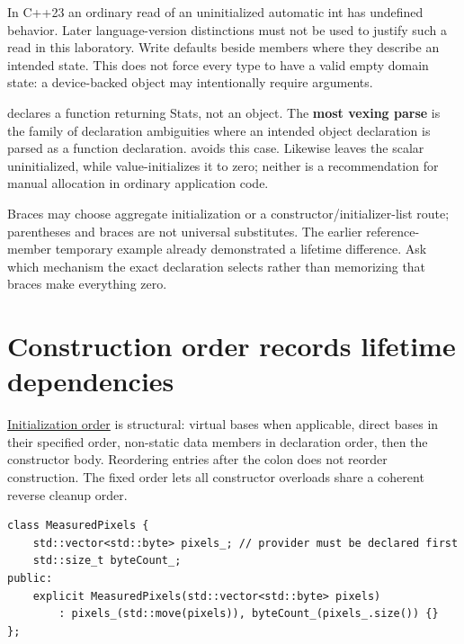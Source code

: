 In C++23 an ordinary read of an uninitialized automatic int has undefined behavior. Later language-version distinctions must not be used to justify such a read in this laboratory. Write defaults beside members where they describe an intended state. This does not force every type to have a valid empty domain state: a device-backed object may intentionally require arguments.

 declares a function returning Stats, not an object. The \textbf{most vexing parse} is the family of declaration ambiguities where an intended object declaration is parsed as a function declaration.  avoids this case. Likewise  leaves the scalar uninitialized, while  value-initializes it to zero; neither is a recommendation for manual allocation in ordinary application code.

Braces may choose aggregate initialization or a constructor/initializer-list route; parentheses and braces are not universal substitutes. The earlier reference-member temporary example already demonstrated a lifetime difference. Ask which mechanism the exact declaration selects rather than memorizing that braces make everything zero.

\section{Construction order records lifetime dependencies}\label{01-foundations-i-ch003-construction-order-records-lifetime-dependencies}

\hypertarget{01-foundations-i-ch003-construction-order-records-lifetime-dependencies}{}

\hyperref[appendix-3cb49709605a]{Initialization order} is structural: virtual bases when applicable, direct bases in their specified order, non-static data members in declaration order, then the constructor body. Reordering entries after the colon does not reorder construction. The fixed order lets all constructor overloads share a coherent reverse cleanup order.

\begin{verbatim}
class MeasuredPixels {
    std::vector<std::byte> pixels_; // provider must be declared first
    std::size_t byteCount_;
public:
    explicit MeasuredPixels(std::vector<std::byte> pixels)
        : pixels_(std::move(pixels)), byteCount_(pixels_.size()) {}
};
\end{verbatim}

